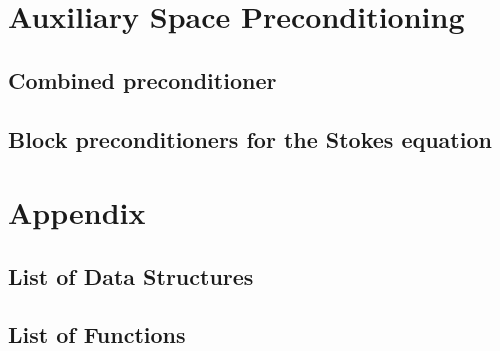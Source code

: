 \documentclass[11pt]{memoir}
\begin{document}
\chapter{Auxiliary Space Preconditioning}\label{ch:asp}

\section{Combined preconditioner}

\section{Block preconditioners for the Stokes equation}

\chapter{Appendix}\label{ch:append}

\section{List of Data Structures}

\section{List of Functions}


\newpage


\end{document}
